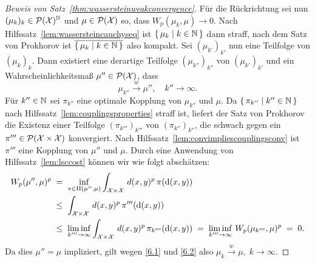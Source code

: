 \documentclass[../main/main.tex]{subfiles}
\begin{document}
\begin{proof}[Beweis von Satz~\ref{thm:wassersteinweakconvergence}]
		Für die Rückrichtung sei nun $(\mu_k)_k \in \mathcal{P}(\mathcal{X})^{\mathbb{N}}$ und $\mu \in \mathcal{P}(\mathcal{X})$ so, dass $W_p(\mu_k, \mu) \to 0$. Nach Hilfssatz~\ref{lem:wassersteincauchyseq} ist $\left\{\, \mu_k \; \middle| \; k \in \mathbb{N} \,\right\}$ dann straff, nach dem Satz von Prokhorov ist $\overline{\left\{\, \mu_k \; \middle| \; k \in \mathbb{N} \,\right\}}$ also kompakt. Sei $(\mu_{k'})_{k'}$ nun eine Teilfolge von $(\mu_k)_k$. Dann existiert eine derartige Teilfolge $(\mu_{k''})_{k''}$ von $(\mu_{k'})_{k'}$ und ein Wahrscheinlichkeitsmaß $\mu'' \in \mathcal{P}(\mathcal{X})$, dass
		\[ \mu_{k''} \xrightarrow{w} \mu'', \quad k'' \to \infty \text{.} \label{6.2} \tag{6.2} \]
		Für $k'' \in \mathbb{N}$ sei $\pi_{k''}$ eine optimale Kopplung von $\mu_{k''}$ und $\mu$. Da $\left\{\, \pi_{k''} \; \middle| \; k'' \in \mathbb{N} \,\right\}$ nach Hilfssatz~\ref{lem:couplingsproperties} straff ist, liefert der Satz von Prokhorov die Existenz einer Teilfolge $(\pi_{k'''})_{k'''}$ von $(\pi_{k''})_{k''}$, die schwach gegen ein $\pi''' \in \mathcal{P}(\mathcal{X} \times \mathcal{X})$ konvergiert. Nach Hilfssatz~\ref{lem:convimpliescouplingsconv} ist $\pi'''$ eine Kopplung von $\mu''$ und $\mu$. Durch eine Anwendung von Hilfssatz~\ref{lem:lsccost} können wir wie folgt abschätzen:
		\begin{align*}
			W_p(\mu'', \mu)^p \; &= \; \inf_{\pi \in \Pi(\mu'', \mu)} \int_{\mathcal{X} \times \mathcal{X}} \, d(x, y)^p \, \pi(\mathrm{d}(x, y)) \\
			                \; &\leq \; \int_{\mathcal{X} \times \mathcal{X}} \, d(x, y)^p \, \pi'''(\mathrm{d}(x, y)) \\
			                \; &\leq \; \liminf_{k''' \to \infty} \int_{\mathcal{X} \times \mathcal{X}} \, d(x, y)^p \, \pi_{k'''}(\mathrm{d}(x, y)) \; = \; \liminf_{k''' \to \infty} \, W_p( \mu_{k'''}, \mu)^p \; = \; 0 \text{.}
		\end{align*}
		Da dies $\mu'' = \mu$ impliziert, gilt wegen \eqref{6.1} und \eqref{6.2} also
		$\mu_k \xrightarrow{w} \mu, \; k \to \infty$.
	\end{proof}
\end{document}

